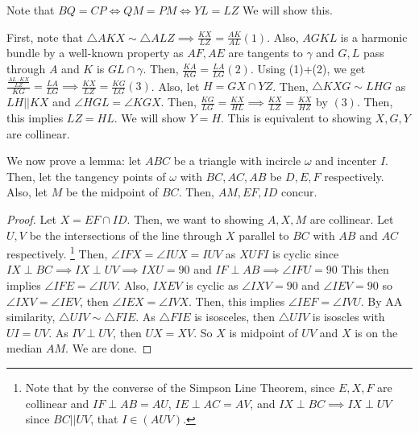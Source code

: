 \documentclass[11pt]{article}
\begin{document}

\begin{sol} Note that $BQ=CP \iff QM = PM \iff YL = LZ$ We will show this.

First, note that $\triangle AKX \sim \triangle ALZ\implies \frac{KX}{LZ} = \frac{AK}{AL} (1)$. Also, $AGKL$ is a harmonic bundle by a well-known property as $AF, AE$ are tangents to $\gamma$ and $G,L$ pass through $A$ and $K$ is $GL \cap \gamma$. Then, $\frac{KA}{KG} = \frac{LA}{LG}(2)$. Using (1)+(2), we get $\frac{\frac{AL\cdot KX}{LZ}}{KG} = \frac{LA}{LG} \implies \frac{KX}{LZ} = \frac{KG}{LG}(3)$. Also, let $H=GX \cap YZ$. Then, $\triangle KXG \sim LHG$ as $LH||KX$ and $\angle HGL = \angle KGX$. Then, $\frac{KG}{LG}=\frac{KX}{HL} \implies \frac{KX}{LZ } = \frac{KX}{HZ}$ by $(3)$. Then, this implies $LZ=HL$. We will show $Y=H$. This is equivalent to showing $X,G,Y$ are collinear.

We now prove a lemma: let $ABC$ be a triangle with incircle $\omega$ and incenter $I$. Then, let the tangency points of $\omega$ with $BC,AC,AB$ be $D,E,F$ respectively. Also, let $M$ be the midpoint of $BC$. Then, $AM, EF, ID$ concur.

\begin{proof}
Let $X=EF \cap ID$. Then, we want to showing $A,X,M$ are collinear. Let $U,V$ be the intersections of the line through $X$ parallel to $BC$ with $AB$ and $AC$ respectively. \footnote{Note that by the converse of the Simpson Line Theorem, since $E,X,F$ are collinear and $IF \perp AB = AU$, $IE \perp AC = AV $, and $IX\perp BC\implies IX\perp UV$ since $BC||UV$, that $I\in (AUV)$.} Then, $\angle IFX = \angle IUX = IUV$ as $XUFI$ is cyclic since $IX\perp BC\implies IX\perp UV\implies IXU = 90$ and $IF\perp AB\implies \angle IFU =90$ This then implies $\angle IFE = \angle IUV$. Also, $IXEV$ is cyclic as $\angle IXV=90$ and $\angle IEV=90$ so $\angle IXV= \angle IEV$, then $\angle IEX=\angle IVX$. Then, this implies $\angle IEF = \angle IVU$. By AA similarity, $\triangle UIV \sim \triangle FIE$. As $\triangle FIE$ is isosceles, then $\triangle UIV$ is isoscles with $UI=UV$. As $IV \perp UV$, then $UX=XV$. So $X$ is midpoint of $UV$ and $X$ is on the median $AM$. We are done.
\end{proof}


\end{sol}
\end{document}
